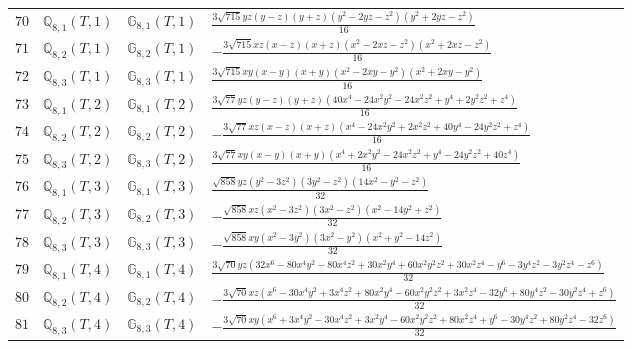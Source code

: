 \documentclass[fleqn,8pt,landscape]{jsarticle}
\begin{document}
\begin{table}[ht!]
\begin{center}
\begin{tabular}{cccl}
$ 70 $ & $ \mathbb{Q}_{8,1}(T,1) $ & $ \mathbb{G}_{8,1}(T,1) $ & $ \frac{3 \sqrt{715} y z \left(y - z\right) \left(y + z\right) \left(y^{2} - 2 y z - z^{2}\right) \left(y^{2} + 2 y z - z^{2}\right)}{16} $ \\
$ 71 $ & $ \mathbb{Q}_{8,2}(T,1) $ & $ \mathbb{G}_{8,2}(T,1) $ & $ - \frac{3 \sqrt{715} x z \left(x - z\right) \left(x + z\right) \left(x^{2} - 2 x z - z^{2}\right) \left(x^{2} + 2 x z - z^{2}\right)}{16} $ \\
$ 72 $ & $ \mathbb{Q}_{8,3}(T,1) $ & $ \mathbb{G}_{8,3}(T,1) $ & $ \frac{3 \sqrt{715} x y \left(x - y\right) \left(x + y\right) \left(x^{2} - 2 x y - y^{2}\right) \left(x^{2} + 2 x y - y^{2}\right)}{16} $ \\
$ 73 $ & $ \mathbb{Q}_{8,1}(T,2) $ & $ \mathbb{G}_{8,1}(T,2) $ & $ \frac{3 \sqrt{77} y z \left(y - z\right) \left(y + z\right) \left(40 x^{4} - 24 x^{2} y^{2} - 24 x^{2} z^{2} + y^{4} + 2 y^{2} z^{2} + z^{4}\right)}{16} $ \\
$ 74 $ & $ \mathbb{Q}_{8,2}(T,2) $ & $ \mathbb{G}_{8,2}(T,2) $ & $ - \frac{3 \sqrt{77} x z \left(x - z\right) \left(x + z\right) \left(x^{4} - 24 x^{2} y^{2} + 2 x^{2} z^{2} + 40 y^{4} - 24 y^{2} z^{2} + z^{4}\right)}{16} $ \\
$ 75 $ & $ \mathbb{Q}_{8,3}(T,2) $ & $ \mathbb{G}_{8,3}(T,2) $ & $ \frac{3 \sqrt{77} x y \left(x - y\right) \left(x + y\right) \left(x^{4} + 2 x^{2} y^{2} - 24 x^{2} z^{2} + y^{4} - 24 y^{2} z^{2} + 40 z^{4}\right)}{16} $ \\
$ 76 $ & $ \mathbb{Q}_{8,1}(T,3) $ & $ \mathbb{G}_{8,1}(T,3) $ & $ \frac{\sqrt{858} y z \left(y^{2} - 3 z^{2}\right) \left(3 y^{2} - z^{2}\right) \left(14 x^{2} - y^{2} - z^{2}\right)}{32} $ \\
$ 77 $ & $ \mathbb{Q}_{8,2}(T,3) $ & $ \mathbb{G}_{8,2}(T,3) $ & $ - \frac{\sqrt{858} x z \left(x^{2} - 3 z^{2}\right) \left(3 x^{2} - z^{2}\right) \left(x^{2} - 14 y^{2} + z^{2}\right)}{32} $ \\
$ 78 $ & $ \mathbb{Q}_{8,3}(T,3) $ & $ \mathbb{G}_{8,3}(T,3) $ & $ - \frac{\sqrt{858} x y \left(x^{2} - 3 y^{2}\right) \left(3 x^{2} - y^{2}\right) \left(x^{2} + y^{2} - 14 z^{2}\right)}{32} $ \\
$ 79 $ & $ \mathbb{Q}_{8,1}(T,4) $ & $ \mathbb{G}_{8,1}(T,4) $ & $ \frac{3 \sqrt{70} y z \left(32 x^{6} - 80 x^{4} y^{2} - 80 x^{4} z^{2} + 30 x^{2} y^{4} + 60 x^{2} y^{2} z^{2} + 30 x^{2} z^{4} - y^{6} - 3 y^{4} z^{2} - 3 y^{2} z^{4} - z^{6}\right)}{32} $ \\
$ 80 $ & $ \mathbb{Q}_{8,2}(T,4) $ & $ \mathbb{G}_{8,2}(T,4) $ & $ - \frac{3 \sqrt{70} x z \left(x^{6} - 30 x^{4} y^{2} + 3 x^{4} z^{2} + 80 x^{2} y^{4} - 60 x^{2} y^{2} z^{2} + 3 x^{2} z^{4} - 32 y^{6} + 80 y^{4} z^{2} - 30 y^{2} z^{4} + z^{6}\right)}{32} $ \\
$ 81 $ & $ \mathbb{Q}_{8,3}(T,4) $ & $ \mathbb{G}_{8,3}(T,4) $ & $ - \frac{3 \sqrt{70} x y \left(x^{6} + 3 x^{4} y^{2} - 30 x^{4} z^{2} + 3 x^{2} y^{4} - 60 x^{2} y^{2} z^{2} + 80 x^{2} z^{4} + y^{6} - 30 y^{4} z^{2} + 80 y^{2} z^{4} - 32 z^{6}\right)}{32} $ \\
 \hline \hline
\end{tabular}
\end{center}
\end{table}
\end{document}

